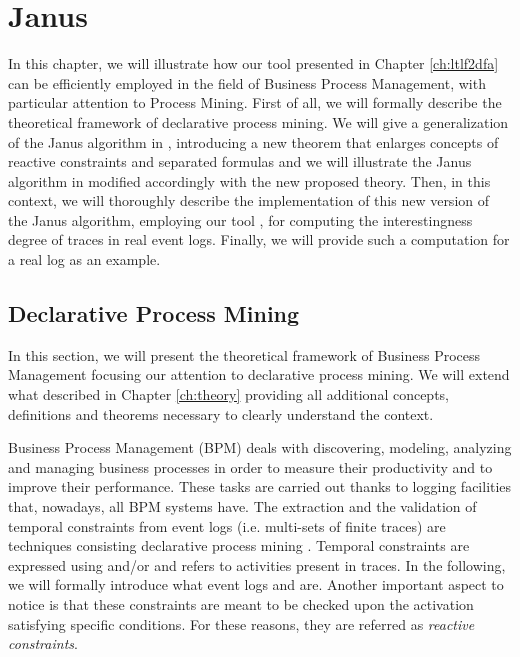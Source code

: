 \chapter{Janus}
In this chapter, we will illustrate how our tool \LTLfToDFA presented in Chapter \ref{ch:ltlf2dfa} can be efficiently employed in the field of Business Process Management, with particular attention to Process Mining. First of all, we will formally describe the theoretical framework of declarative process mining. We will give a generalization of the Janus algorithm in \citep{cecconi2018interestingness}, introducing a new theorem that enlarges concepts of reactive constraints and separated formulas and we will illustrate the Janus algorithm in \citep{cecconi2018interestingness} modified accordingly with the new proposed theory. Then, in this context, we will thoroughly describe the implementation of this new version of the Janus algorithm, employing our tool \LTLfToDFA, for computing the interestingness degree of traces in real event logs. Finally, we will provide such a computation for a real log as an example. 
\section{Declarative Process Mining}
In this section, we will present the theoretical framework of Business Process Management focusing our attention to declarative process mining. We will extend what described in Chapter \ref{ch:theory} providing all additional concepts, definitions and theorems necessary to clearly understand the context.

Business Process Management (BPM) deals with discovering, modeling, analyzing and managing business processes in order to measure their productivity and to improve their performance. These tasks are carried out thanks to logging facilities that, nowadays, all BPM systems have. The extraction and the validation of temporal constraints from event logs (i.e. multi-sets of finite traces) are techniques consisting declarative process mining \citep{montali2010declarative}. Temporal constraints are expressed using \LTLf and/or \PLTL and refers to activities present in traces. In the following, we will formally introduce what event logs and \declare \citep{pesic2008constraint} are. Another important aspect to notice is that these constraints are meant to be checked upon the activation satisfying specific conditions. For these reasons, they are referred as \emph{reactive constraints}.
